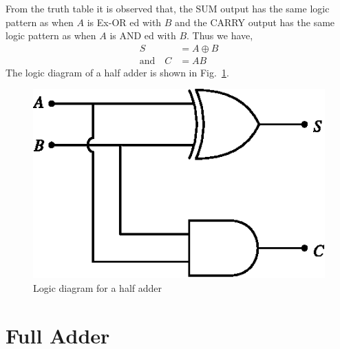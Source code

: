 From the truth table it is observed that, the SUM output has the same logic pattern as when $A$ is Ex-OR ed with $B$ and the CARRY output has the same logic pattern as when $A$ is AND ed with $B$. Thus we have,
\begin{align*}
S &= A\oplus B\\[3pt]
\text{and}\quad C &= AB
\end{align*}
The logic diagram of a half adder is shown in Fig.~\ref{fig5.25}.
\begin{figure}[H]
\centering
\includegraphics[scale=1.05]{chap5/fig5.18.eps}
\caption{Logic diagram for a half adder}\label{fig5.25}
\end{figure}

\section{Full Adder}\label{sec5.17}

